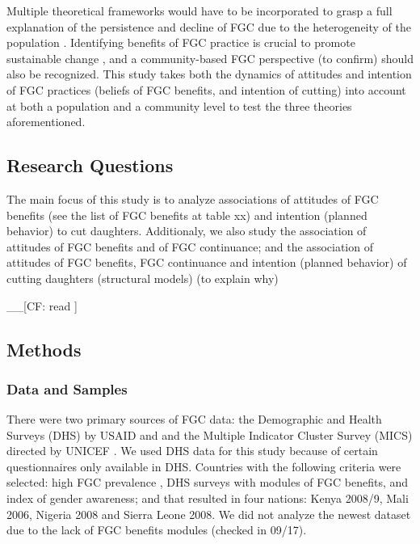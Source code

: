 \documentclass[12pt,]{article}
\begin{document}
Multiple theoretical frameworks would have to be incorporated to grasp a full explanation of the persistence and decline of FGC due to the heterogeneity of the population \cite{Hayf05, EffeVogt15, ModrLiu13}.  Identifying benefits of FGC practice is crucial to promote sustainable change \cite{EffeVogt15}, and a community-based FGC perspective \cite{BoylCorl010, Drol11,Hayf05, Grue05, Hodg11, KandNwak09, OdukAfol17} (to confirm) should also be recognized.  This study takes both the dynamics of attitudes and intention of FGC practices (beliefs of FGC benefits, and intention of cutting) into account at both a population and a community level to test the three theories aforementioned.

\subsection{Research Questions}\label{research-questions}
The main focus of this study is to analyze associations of attitudes of FGC benefits (see the list of FGC benefits at table xx) and intention (planned behavior) to cut daughters.  Additionaly, we also study the association of attitudes of FGC benefits and of FGC continuance; and the association of attitudes of FGC benefits, FGC continuance and intention (planned behavior) of cutting daughters (structural models) (to explain why) 

\_\_{[}CF: read \cite{Aske05, Brue05}{]}

\subsection{Methods}\label{methods}

\subsubsection{Data and Samples}\label{data-and-samples}

There were two primary sources of FGC data: the Demographic and Health Surveys (DHS) by USAID and and the Multiple Indicator Cluster Survey (MICS) directed by UNICEF \cite{CappMone13, YodeWang13}. We used DHS data for this study because of certain questionnaires only available in DHS.  Countries with the following criteria were selected:  high FGC prevalence \cite{UNIC16}, DHS surveys with modules of FGC benefits, and index of gender awareness; and that resulted in four nations:  Kenya 2008/9, Mali 2006, Nigeria 2008 and Sierra Leone 2008.  We did not analyze the newest dataset due to the lack of FGC benefits modules (checked in 09/17).
\end{document}
